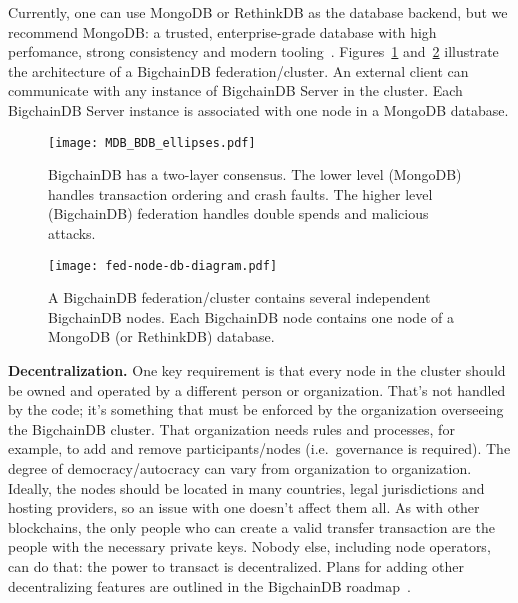 \documentclass[a4paper]{article}
\begin{document}
Currently, one can use MongoDB or RethinkDB as the database backend,
but we recommend MongoDB:
a trusted, enterprise-grade database with
high perfomance, strong consistency and modern tooling~\cite{mongodb}.
Figures~\ref{fig:system_diagram} and~\ref{fig:federation_node_db} illustrate the architecture
of a BigchainDB federation/cluster.
An external client can communicate with any instance of BigchainDB Server
in the cluster.
Each BigchainDB Server instance is associated with one node
in a MongoDB database.


\begin{figure}[!ht]
  \centering
  \texttt{[image: MDB\_BDB\_ellipses.pdf]}
  \caption{BigchainDB has a two-layer consensus. The lower level (MongoDB) handles transaction ordering and crash faults. The higher level (BigchainDB) federation handles double spends and malicious attacks.}
  \label{fig:system_diagram}
\end{figure}


\begin{figure}[!ht]
  \centering
  \texttt{[image: fed-node-db-diagram.pdf]}
  \caption{A BigchainDB federation/cluster contains several independent BigchainDB nodes. Each BigchainDB node contains one node of a MongoDB (or RethinkDB) database.}
  \label{fig:federation_node_db}
\end{figure}


\noindent \textbf{Decentralization.}
One key requirement is that every node in the cluster should be owned and operated
by a different person or organization.
That's not handled by the code;
it's something that must be enforced by the organization overseeing
the BigchainDB cluster.
That organization needs rules and processes, for example,
to add and remove participants/nodes (i.e.~governance is required).
The degree of democracy/autocracy can vary from organization to organization.
Ideally, the nodes should be located in many countries,
legal jurisdictions and hosting providers,
so an issue with one doesn't affect them all.
As with other blockchains,
the only people who can create a valid transfer transaction
are the people with the necessary private keys.
Nobody else, including node operators, can do that:
the power to transact is decentralized.
Plans for adding other decentralizing features
are outlined in the BigchainDB roadmap~\cite{bigchaindb_roadmap}.

\vspace{1 em}
\end{document}
